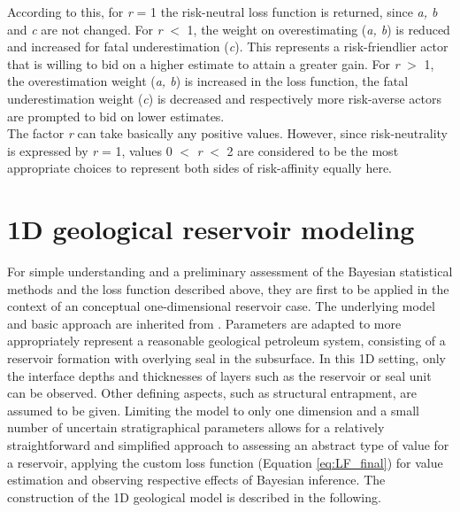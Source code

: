 		According to this, for \textit{r} = 1 the risk-neutral loss function is returned, since \textit{a, b} and \textit{c} are not changed. For \textit{r} $<$ 1, the weight on overestimating (\textit{a, b}) is reduced and increased for fatal underestimation (\textit{c}). This represents a risk-friendlier actor that is willing to bid on a higher estimate to attain a greater gain. For \textit{r} $>$ 1, the overestimation weight (\textit{a, b}) is increased in the loss function, the fatal underestimation weight (\textit{c}) is decreased and respectively more risk-averse actors are prompted to bid on lower estimates.\\		
		The factor \textit{r} can take basically any positive values. However, since risk-neutrality is expressed by \textit{r} = 1, values 0 $<$ \textit{r} $<$ 2 are considered to be the most appropriate choices to represent both sides of risk-affinity equally here.		
		
		\section{1D geological reservoir modeling}\label{sec:1D_model}
		For simple understanding and a preliminary assessment of the Bayesian statistical methods and the loss function described above, they are first to be applied in the context of an conceptual one-dimensional reservoir case. The underlying model and basic approach are inherited from \citet{delaVarga2016}. Parameters are adapted to more appropriately represent a reasonable geological petroleum system, consisting of a reservoir formation with overlying seal in the subsurface. In this 1D setting, only the interface depths and thicknesses of layers such as the reservoir or seal unit can be observed. Other defining aspects, such as structural entrapment, are assumed to be given. Limiting the model to only one dimension and a small number of uncertain stratigraphical parameters allows for a relatively straightforward and simplified approach to assessing an abstract type of value for a reservoir, applying the custom loss function (Equation \ref{eq:LF_final}) for value estimation and observing respective effects of Bayesian inference. The construction of the 1D geological model is described in the following.
		
